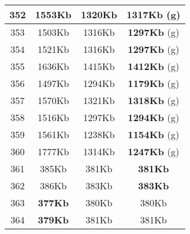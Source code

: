 \begin{table}[H]
\begin{minipage}{5cm}
{\begin{tabular}{|c|c|c|c|}
\hline
352 & 1553Kb & 1320Kb & \textbf{1317Kb} (g) \\
\hline
353 & 1503Kb & 1316Kb & \textbf{1297Kb} (g) \\
\hline
354 & 1521Kb & 1316Kb & \textbf{1297Kb} (g) \\
\hline
355 & 1636Kb & 1415Kb & \textbf{1412Kb} (g) \\
\hline
356 & 1497Kb & 1294Kb & \textbf{1179Kb} (g) \\
\hline
357 & 1570Kb & 1321Kb & \textbf{1318Kb} (g) \\
\hline
358 & 1516Kb & 1297Kb & \textbf{1294Kb} (g) \\
\hline
359 & 1561Kb & 1238Kb & \textbf{1154Kb} (g) \\
\hline
360 & 1777Kb & 1314Kb & \textbf{1247Kb} (g) \\
\hline
361 & 385Kb & 381Kb & \textbf{381Kb} \\
\hline
362 & 386Kb & 383Kb & \textbf{383Kb} \\
\hline
363 & \textbf{377Kb} & 380Kb & 380Kb \\
\hline
364 & \textbf{379Kb} & 381Kb & 381Kb \\
\hline
\end{tabular}
}
\end{minipage}
\end{table}

\begin{table}[H]
\begin{minipage}{5cm} 
\end{minipage}
\caption{Memoria di esecuzione in kilobyte dei problemi Disjunctive Binding (FOF) di Vampire, 1b naif e 1b}
\end{table}
